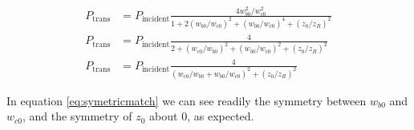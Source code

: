 \begin{align}
    P_{\mathrm{trans}}  &= P_{\mathrm{incident}} \frac{4 w_{b0}^2 / w_{c0}^2}{1 +
    2 \left( w_{b0} /w_{c0} \right)^2 + \left( w_{b0} /w_{c0} \right)^4 + \left(
    z_0 / z_R \right)^2} \nonumber
\\  P_{\mathrm{trans}}  &= P_{\mathrm{incident}} \frac{4}{ 2 + \left( w_{c0} /
    w_{b0} \right)^2 + \left( w_{b0} /w_{c0} \right)^2 + \left(
    z_0 / z_R \right)^2}
\\  P_{\mathrm{trans}}  &= P_{\mathrm{incident}} \frac{4}{ \left( w_{c0} /
    w_{b0} + w_{b0} / w_{c0} \right)^2 + \left( z_0 / z_R \right)^2}
    \label{eq:symetricmatch}
\end{align}

In equation \ref{eq:symetricmatch} we can see readily the symmetry between
$w_{b0}$ and $w_{c0}$, and the symmetry of $z_0$ about $0$, as expected.

